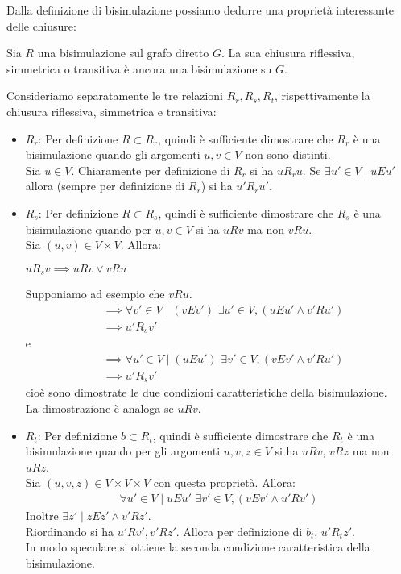 Dalla definizione di bisimulazione possiamo dedurre una proprietà interessante delle chiusure:
\begin{theorem}
    Sia $R$ una bisimulazione sul grafo diretto $G$. La sua chiusura riflessiva, simmetrica o transitiva è ancora una bisimulazione su $G$.
\end{theorem}
\begin{proof2}
    Consideriamo separatamente le tre relazioni $R_r, R_s, R_t$, rispettivamente la chiusura riflessiva, simmetrica e transitiva:
    \begin{itemize}
        \item $R_r$: Per definizione $R \subset R_r$, quindi è sufficiente dimostrare che $R_r$ è una bisimulazione quando gli argomenti $u,v \in V$ non sono distinti.\\
        Sia $u \in V$. Chiaramente per definizione di $R_r$ si ha $u R_r u$. Se $\exists u' \in V \mid u E u'$ allora (sempre per definizione di $R_r$) si ha $u' R_r u'$.
        \item $R_s$: Per definizione $R \subset R_s$, quindi è sufficiente dimostrare che $R_s$ è una bisimulazione quando per $u,v \in V$ si ha $u R v$ ma non $v R u$.\\
        Sia $(u,v) \in V\times V$. Allora:
        \begin{center}
            $u R_s v \implies u R v \lor v R u$
        \end{center}
        Supponiamo ad esempio che $v R u$.
        \begin{align*}
            &\implies \forall v' \in V\mid (v E v') \,\,\exists u' \in V, (u E u' \land v' R u')\\
            &\implies u' R_s v'
        \end{align*}
        e
        \begin{align*}
            &\implies \forall u' \in V\mid (u E u') \,\,\exists v' \in V, (v E v' \land v' R u')\\
            &\implies u' R_s v'
        \end{align*}
        cioè sono dimostrate le due condizioni caratteristiche della bisimulazione.\\
        La dimostrazione è analoga se $u R v$.
        \item $R_t$: Per definizione $b \subset R_t$, quindi è sufficiente dimostrare che $R_t$ è una bisimulazione quando per gli argomenti $u,v,z \in V$ si ha $u R v$, $v R z$ ma non $u R z$.\\
        Sia $(u,v,z) \in V\times V\times V$ con questa proprietà. Allora:
        \begin{gather*}
            \forall u' \in V\mid u E u' \,\, \exists v' \in V, (v E v' \land u' R v')
        \end{gather*}
        Inoltre $\exists z' \mid z E z' \land v' R z'$.\\
        Riordinando si ha $u' R v', v' R z'$. Allora per definizione di $b_t, \, u' R_t z'$.\\
        In modo speculare si ottiene la seconda condizione caratteristica della bisimulazione.
    \end{itemize}
    \vspace*{-0.75cm}
\end{proof2}
